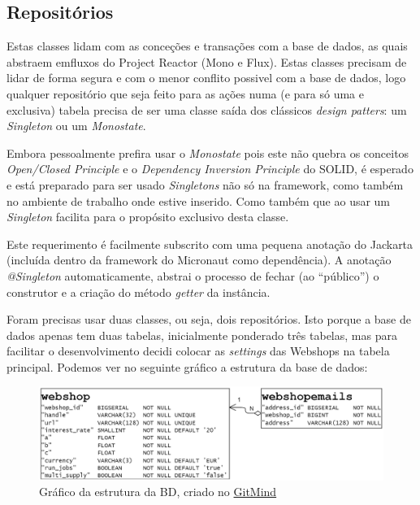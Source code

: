 \newpage

\subsection{Repositórios}

Estas classes lidam com as conceções e transações com a base de dados, as quais abstraem emfluxos do Project Reactor (Mono e Flux). Estas classes precisam de lidar de forma segura e com o menor conflito possivel com a base de dados, logo qualquer repositório que seja feito para as ações numa (e para só uma e exclusiva) tabela precisa de ser uma classe saída dos clássicos \textit{design patters}: um \textit{Singleton} ou um \textit{Monostate}.

Embora pessoalmente prefira usar o \textit{Monostate} pois este não quebra os conceitos \textit{Open/Closed Principle} e o \textit{Dependency Inversion Principle} do SOLID, é esperado e está preparado para ser usado \textit{Singletons} não só na framework, como também no ambiente de trabalho onde estive inserido. Como também que ao usar um \textit{Singleton} facilita para o propósito exclusivo desta classe.

Este requerimento é facilmente subscrito com uma pequena anotação do Jackarta (incluída dentro da framework do Micronaut como dependência). A anotação \textit{@Singleton} automaticamente, abstrai o processo de fechar (ao ``público'') o construtor e a criação do método \textit{getter} da instância.

Foram precisas usar duas classes, ou seja, dois repositórios. Isto porque a base de dados apenas tem duas tabelas, inicialmente ponderado três tabelas, mas para facilitar o desenvolvimento decidi colocar as \textit{settings} das Webshops na tabela principal. Podemos ver no seguinte gráfico a estrutura da base de dados:

\begin{figure}[!hbt]
  \centering
  \includegraphics[width=15cm]{figuras/db.png}
  \caption{Gráfico da estrutura da BD, criado no \href{https://gitmind.com/app/flowchart /51b11741757}{GitMind}}
  \label{fig:db}
\end{figure}
\FloatBarrier

